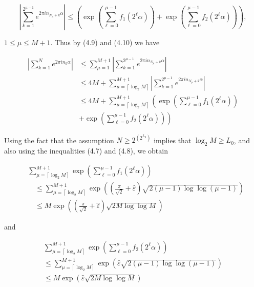 \documentclass[10pt]{article}
\begin{document}
$$
\left|\sum_{k=1}^{2^{\mu-1}} e^{2 \pi i n_{N_{\mu}+k} \alpha}\right| \leqslant\left(\exp \left(\sum_{\ell=0}^{\mu-1} f_{1}\left(2^{\ell} \alpha\right)\right)+\exp \left(\sum_{\ell=0}^{\mu-1} f_{2}\left(2^{\ell} \alpha\right)\right)\right),
$$

$1 \leqslant \mu \leqslant M+1$. Thus by (4.9) and (4.10) we have


\begin{align*}
\left|\sum_{k=1}^{N} e^{2 \pi i n_{k} \alpha}\right| & \leqslant \sum_{\mu=1}^{M+1}\left|\sum_{k=1}^{2^{\mu-1}} e^{2 \pi i n_{N_{\mu}+k} \alpha}\right|  \tag{4.11}\\
& \leqslant 4 M+\sum_{\mu=\left\lceil\log _{2} M\right\rceil}^{M+1}\left|\sum_{k=1}^{2^{\mu-1}} e^{2 \pi i n_{N_{\mu}+k} \alpha}\right| \\
& \leqslant 4 M+\sum_{\mu=\left\lceil\log _{2} M\right\rceil}^{M+1}\left(\exp \left(\sum_{\ell=0}^{\mu-1} f_{1}\left(2^{\ell} \alpha\right)\right)\right.  \tag{4.12}\\
& \left.+\exp \left(\sum_{\ell=0}^{\mu-1} f_{2}\left(2^{\ell} \alpha\right)\right)\right)
\end{align*}


Using the fact that the assumption $N \geqslant 2^{\left(2^{L_{0}}\right)}$ implies that $\log _{2} M \geqslant L_{0}$, and also using the inequalities (4.7) and (4.8), we obtain


\begin{align*}
& \sum_{\mu=\left\lceil\log _{2} M\right\rceil}^{M+1} \exp \left(\sum_{\ell=0}^{\mu-1} f_{1}\left(2^{\ell} \alpha\right)\right)  \tag{4.13}\\
& \quad \leqslant \sum_{\mu=\left\lceil\log _{2} M\right\rceil}^{M+1} \exp \left(\left(\frac{\pi}{\sqrt{2}}+\hat{\varepsilon}\right) \sqrt{2(\mu-1) \log \log (\mu-1)}\right) \\
& \quad \leqslant M \exp \left(\left(\frac{\pi}{\sqrt{2}}+\hat{\varepsilon}\right) \sqrt{2 M \log \log M}\right)
\end{align*}


and


\begin{gather*}
\sum_{\mu=\left\lceil\log _{2} M\right\rceil}^{M+1} \exp \left(\sum_{\ell=0}^{\mu-1} f_{2}\left(2^{\ell} \alpha\right)\right)  \tag{4.14}\\
\leqslant \sum_{\mu=\left\lceil\log _{2} M\right\rceil}^{M+1} \exp (\hat{\varepsilon} \sqrt{2(\mu-1) \log \log (\mu-1)}) \\
\leqslant M \exp (\hat{\varepsilon} \sqrt{2 M \log \log M})
\end{gather*}
\end{document}
